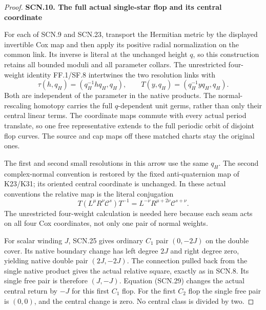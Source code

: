 \begin{proof}
\par

\medskip\noindent\textbf{SCN.10. The full actual single-star flop and its central coordinate}

\par\nobreak

For each of SCN.9 and SCN.23, transport the Hermitian
metric by the displayed invertible Cox map and then
apply its positive radial normalization on the common
link. Its inverse is literal at the unchanged height
\(q\), so this construction retains all bounded
moduli and all parameter collars. The unrestricted
four-weight identity FF.1/SF.8 intertwines the two
resolution links with
\[
  \tau(h,q_H)=(q_H^{-1}h q_H,q_H),\qquad
  T(y,q_H)=(q_H^{-1}yq_H,q_H).                         \tag{SCN.28}
\]
Both are independent of the parameter in the native
products. The normal-rescaling homotopy carries the
full \(q\)-dependent unit germs, rather than only
their central linear terms. The coordinate maps
commute with every actual period translate, so one
free representative extends to the full periodic
orbit of disjoint flop curves. The source and cap
maps off these matched charts stay the original ones.

The first and second small resolutions in this arrow
use the same \(q_H\). The second complex-normal
convention is restored by the fixed anti-quaternion
map of K23/K31; its oriented central coordinate is
unchanged. In these actual conventions the relative
map is the literal conjugation
\[
 T(L^\mu R^\nu\mathcal C^s)T^{-1}
          =L^{-\nu}R^{\mu+2\nu}\mathcal C^{s+\nu}.
                                                        \tag{SCN.29}
\]
The unrestricted four-weight calculation is needed
here because each seam acts on all four Cox
coordinates, not only one pair of normal weights.

For scalar winding \(J\), SCN.25 gives ordinary
\(C_1\) pair \((0,-2J)\) on the double cover. Its
native boundary change has left degree \(2J\) and
right degree zero, yielding native double pair
\((2J,-2J)\). The connection pulled back from the
single native product gives the actual relative
square, exactly as in SCN.8. Its single free pair
is therefore \((J,-J)\). Equation (SCN.29) changes
the actual central return by \(-J\) for this first
\(C_1\) flop. For the first \(C_2\) flop the single
free pair is \((0,0)\), and the central change is
zero. No central class is divided by two.
\end{proof}
